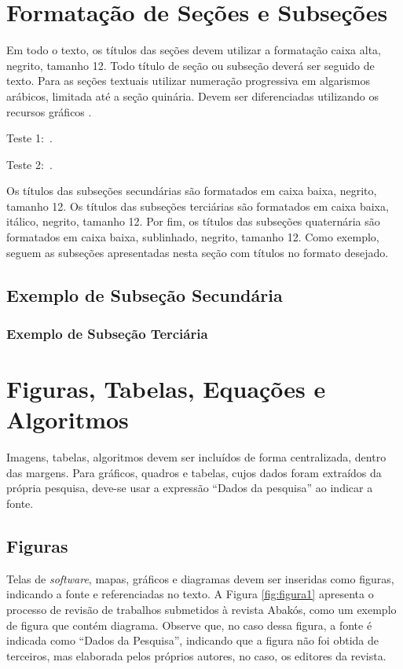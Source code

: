 \documentclass[a4paper,12pt]{article}
\begin{document}
	
	\section{Formatação de Seções e Subseções}
	\label{sec:sec}
	
	Em todo o texto, os títulos das seções devem utilizar a formatação caixa alta, negrito, tamanho 12. Todo título de seção ou subseção deverá ser seguido de texto. Para as seções textuais utilizar numeração progressiva em algarismos arábicos, limitada até a seção quinária. Devem ser diferenciadas utilizando os recursos gráficos \cite{manualpucartigo}.
	
	Teste 1:~\cite{ponciano2018agreement, manualpuccit}. 
	
	Teste 2:~. 
	
	
	Os títulos das subseções secundárias são formatados em caixa baixa, negrito, tamanho 12. Os títulos das subseções terciárias são formatados em caixa baixa, itálico, negrito, tamanho 12. Por fim, os títulos das subseções quaternária são formatados em caixa baixa, sublinhado, negrito, tamanho 12. Como exemplo, seguem as subseções apresentadas nesta seção com títulos no formato desejado.
	
	\subsection{Exemplo de Subseção Secundária}
	\subsubsection{Exemplo de Subseção Terciária}
	
	
	\section{Figuras, Tabelas, Equações e Algoritmos}
	\label{sec:figTabEqAlg}
	
	Imagens, tabelas, algoritmos devem ser incluídos de forma centralizada, dentro das margens. Para gráficos, quadros e tabelas, cujos dados foram extraídos da própria pesquisa, deve-se  usar a expressão “Dados da pesquisa” ao indicar a fonte.
	
	\subsection{Figuras}
	
	Telas de \textit{software}, mapas, gráficos e diagramas devem ser inseridas como figuras, indicando a fonte e referenciadas no texto. A Figura \ref{fig:figura1} apresenta o processo de revisão de trabalhos submetidos à revista Abakós, como um exemplo de figura que contém diagrama. Observe que, no caso dessa figura, a fonte é indicada como ``Dados da Pesquisa'', indicando que a figura não foi obtida de terceiros, mas elaborada pelos próprios autores, no caso, os editores da revista.
	
\end{document}
